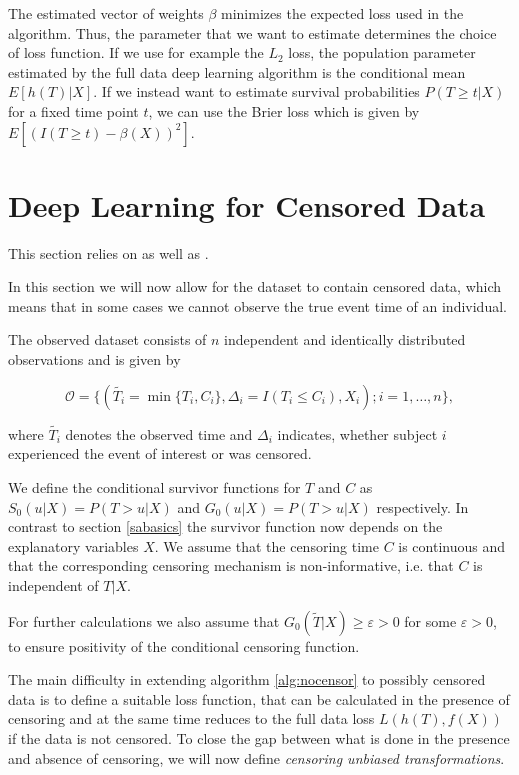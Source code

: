 \documentclass[12pt, a4paper]{article}
\theoremstyle{definition}
\theoremstyle{plain}
\numberwithin{equation}{section}
\numberwithin{figure}{section}
\numberwithin{table}{section}
\begin{document}
 	The estimated vector of weights $\beta$ minimizes the expected loss used in the algorithm.
 	Thus, the parameter that we want to estimate determines the choice of loss function.
 	If we use for example the $L_2$ loss, the population parameter estimated by the full data deep learning algorithm is the conditional mean $E[h(T) \vert X]$.
 	If we instead want to estimate survival probabilities $P(T\geq t \vert X )$ for a fixed time point $t$, we can use the Brier loss which is given by $E[(I(T\geq t)-\beta(X))^2]$.
 	
	\newpage
	\section{Deep Learning for Censored Data} \label{censored}
	
	This section relies on \citet*{basearticle} as well as \citet*{deeplbook}.
	
	In this section we will now allow for the dataset to contain censored data, which means that in some cases we cannot observe the true event time of an individual.
	
	The observed dataset consists of $n$ independent and identically distributed observations and is given by 
	
	\begin{equation*}
	\mathcal{O} = \{(\tilde{T_i} = \min \{T_i, C_i\}, \Delta_i = I(T_i \leq C_i), X_i); i = 1,\dots,n\},
	\end{equation*}
	 
	 where $\tilde{T_i}$ denotes the observed time and $\Delta_i$ indicates, whether subject $i$ experienced the event of interest or was censored.
	 
	 We define the conditional survivor functions for $T$ and $C$ as $S_0(u \vert X)=P(T>u \vert X)$ and $G_0(u \vert X)=P(T>u \vert X)$ respectively.
	 In contrast to section \ref{sabasics} the survivor function now depends on the explanatory variables $X$.
	 We assume that the censoring time $C$ is continuous and that the corresponding censoring mechanism is non-informative, i.e. that $C$ is independent of $T\vert X$.
	 
	 For further calculations we also assume that $G_0(\tilde{T} \vert X)\geq \varepsilon > 0$ for some $\varepsilon >0$, to ensure positivity of the conditional censoring function.
	
	The main difficulty in extending algorithm \ref{alg:nocensor} to possibly censored data is to define a suitable loss function, that can be calculated in the presence of censoring and at the same time reduces to the full data loss $L(h(T), f(X))$ if the data is not censored.
	To close the gap between what is done in the presence and absence of censoring, we will now define \textit{censoring unbiased transformations}.
	
\end{document}
